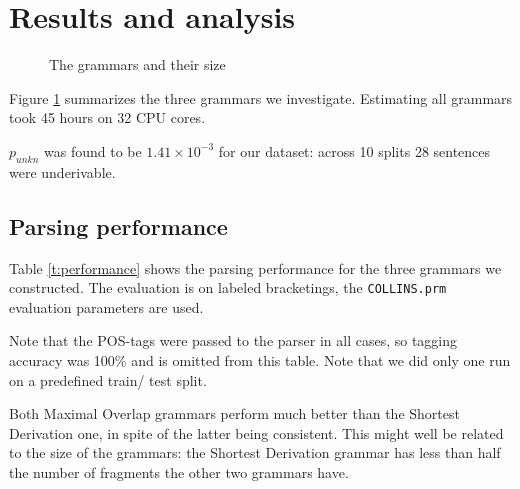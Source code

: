 \section{Results and analysis}\label{sec:Results}
\begin{figure}[h!]
\caption{The grammars and their size}
\label{f:grammars}
\end{figure}

Figure \ref{f:grammars} summarizes the three grammars we investigate. Estimating all grammars took 45 hours on 32 CPU cores.



$p_{unkn}$ was found to be $1.41\times 10^{-3}$ for our dataset: across 10 splits 28 sentences were underivable.

\subsection{Parsing performance}

\begin{table}
\center

\label{t:performance}
\end{table}

Table \ref{t:performance} shows the parsing performance for the three grammars we constructed. The evaluation is on labeled bracketings, the {\tt COLLINS.prm} evaluation parameters are used.

 Note that the POS-tags were passed to the parser in all cases, so tagging accuracy was 100\% and is omitted from this table. 
Note that we did only one run on a predefined train/ test split.

Both Maximal Overlap grammars perform much better than the Shortest Derivation one, in spite of the latter being consistent. 
This might well be related to the size of the grammars: the Shortest Derivation grammar has less than half the number of fragments the other two grammars have. 

